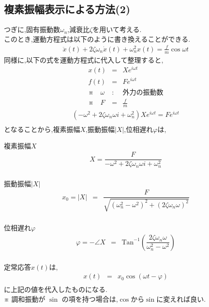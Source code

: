 \documentclass[a4paper]{jsarticle}
\begin{document}
\subsection{複素振幅表示による方法(2)}
つぎに,固有振動数$\omega_n$,減衰比$\zeta$を用いて考える.\\
このとき,運動方程式は以下のように書き換えることができる.
\begin{eqnarray*}
    \ddot{x}\left(t\right)+2\zeta\omega_n\dot{x}\left(t\right)+\omega_n^2 x\left(t\right)=\frac{f}{m}\cos\omega t
\end{eqnarray*}
同様に,以下の式を運動方程式に代入して整理すると,
\begin{eqnarray*}
    x\left(t\right)&=&Xe^{i\omega t}\\
    f\left(t\right)&=&Fe^{i\omega t}\\
    ※\quad\omega &:& 外力の振動数\\
    ※\quad F &=& \frac{f}{m}
\end{eqnarray*}
\begin{eqnarray*}
    \left(-\omega^2+2\zeta\omega_n\omega i+\omega_n^2\right)Xe^{i\omega t}=Fe^{i\omega t}\\
\end{eqnarray*}
となることから,複素振幅$X$,振動振幅$|X|$,位相遅れ$\varphi$は,
\begin{itembox}[l]{複素振幅$X$}
    \begin{eqnarray*}
        X=\dfrac{F}{-\omega^2+2\zeta\omega_n\omega i+\omega_n^2}\\
    \end{eqnarray*}
\end{itembox}
\begin{itembox}[l]{振動振幅$|X|$}
    \begin{eqnarray*}
        x_0=|X|&=&\dfrac{F}{\sqrt{\left(\omega_n^2-\omega^2\right)^2+\left(2\zeta\omega_n\omega\right)^2}}\\
    \end{eqnarray*}
\end{itembox}
\begin{itembox}[l]{位相遅れ$\varphi$}
    \begin{eqnarray*}
        \varphi=-\angle X &=&\mathrm{Tan}^{-1}\left(\dfrac{2\zeta\omega_n\omega}{\omega_n^2-\omega^2}\right)\\
    \end{eqnarray*}
\end{itembox}
定常応答$x\left(t\right)$は,
\begin{eqnarray*}
    x\left(t\right)&=&x_0\cos\left(\omega t-\varphi\right)\\
\end{eqnarray*}
に上記の値を代入したものになる.\\
※ 調和振動が $\sin$ の項を持つ場合は,$\cos$から$\sin$に変えれば良い.
\end{document}
